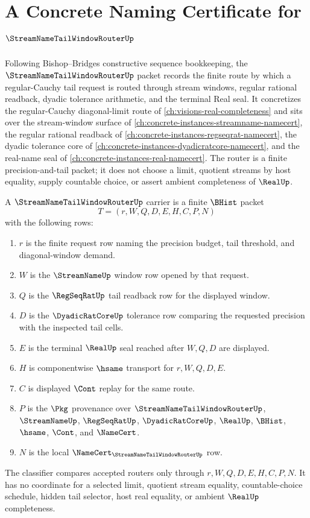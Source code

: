 \chapter{A Concrete Naming Certificate for $\StreamNameTailWindowRouterUp$}
\label{ch:concrete-instances-streamname-tail-window-router-namecert}

Following Bishop--Bridges constructive sequence bookkeeping, the $\StreamNameTailWindowRouterUp$ packet records the finite route by which a regular-Cauchy tail request is routed through stream windows, regular rational readback, dyadic tolerance arithmetic, and the terminal Real seal. It concretizes the regular-Cauchy diagonal-limit route of \autoref{ch:visions-real-completeness} and sits over the stream-window surface of \autoref{ch:concrete-instances-streamname-namecert}, the regular rational readback of \autoref{ch:concrete-instances-regseqrat-namecert}, the dyadic tolerance core of \autoref{ch:concrete-instances-dyadicratcore-namecert}, and the real-name seal of \autoref{ch:concrete-instances-real-namecert}. The router is a finite precision-and-tail packet; it does not choose a limit, quotient streams by host equality, supply countable choice, or assert ambient completeness of $\RealUp$.

\begin{definition}\label{def:streamname-tail-window-router-carrier}
A $\StreamNameTailWindowRouterUp$ carrier is a finite $\BHist$ packet
$$
T=(r,W,Q,D,E,H,C,P,N)
$$
with the following rows:
\begin{enumerate}
  \item $r$ is the finite request row naming the precision budget, tail threshold, and diagonal-window demand.
  \item $W$ is the $\StreamNameUp$ window row opened by that request.
  \item $Q$ is the $\RegSeqRatUp$ tail readback row for the displayed window.
  \item $D$ is the $\DyadicRatCoreUp$ tolerance row comparing the requested precision with the inspected tail cells.
  \item $E$ is the terminal $\RealUp$ seal reached after $W,Q,D$ are displayed.
  \item $H$ is componentwise $\hsame$ transport for $r,W,Q,D,E$.
  \item $C$ is displayed $\Cont$ replay for the same route.
  \item $P$ is the $\Pkg$ provenance over $\StreamNameTailWindowRouterUp$, $\StreamNameUp$, $\RegSeqRatUp$, $\DyadicRatCoreUp$, $\RealUp$, $\BHist$, $\hsame$, $\Cont$, and $\NameCert$.
  \item $N$ is the local $\NameCert_{\StreamNameTailWindowRouterUp}$ row.
\end{enumerate}
The classifier compares accepted routers only through $r,W,Q,D,E,H,C,P,N$. It has no coordinate for a selected limit, quotient stream equality, countable-choice schedule, hidden tail selector, host real equality, or ambient $\RealUp$ completeness.
\end{definition}

